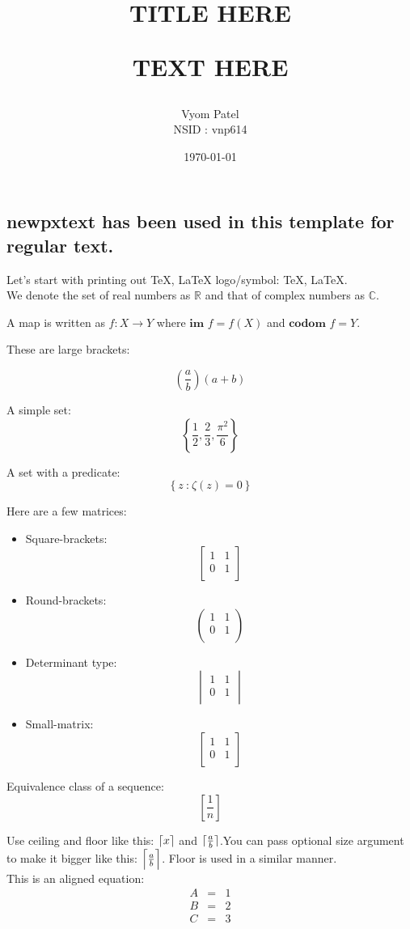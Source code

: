 \documentclass[fleqn]{article}
\title{\textbf{\huge{TITLE HERE}}
	
    \huge{TEXT HERE}
}
\author{Vyom Patel \\ NSID : vnp614}
\date{\today}
\DeclarePairedDelimiter{\ceil}{\lceil}{\rceil}
\newcommand{\latex}{\LaTeX}
\newcommand{\tex}{\TeX\xspace}
\newcommand{\R}{\mathbb{R}}
\newcommand{\C}{\mathbb{C}}
\newcommand{\fn}[3]{#1 : #2 \rightarrow #3}
\newcommand{\br}[1]{\left( #1 \right)}
\newcommand{\curly}[1]{\left\{ #1 \right\}}
\newcommand{\set}[2]{\curly{#1\ \textbf{:}\ #2}}
\newcommand{\im}{\textbf{im }}
\newcommand{\codom}{\textbf{codom }}
\newcommand{\sbr}[1]{\left[ #1 \right]}
\newcommand{\eqn}[1]{\begin{eqnarray*} #1 \end{eqnarray*}}
\newcommand{\bmat}[1]{\ensuremath{\begin{bmatrix} #1 \end{bmatrix}}}
\newcommand{\pmat}[1]{\ensuremath{\begin{pmatrix} #1 \end{pmatrix}}}
\newcommand{\vmat}[1]{\ensuremath{\begin{vmatrix} #1 \end{vmatrix}}}
\newcommand{\smat}[1]{\ensuremath{\left[\begin{smallmatrix} #1 \end{smallmatrix}\right]}}
\begin{document}
\maketitle

\subsection{newpxtext has been used in this template for regular text.}

Let's start with printing out TeX, LaTeX logo/symbol: \tex , \latex. \\
We denote the set of real numbers as $\R$ and that of complex numbers as
$\C$.

A map is written as $\fn{f}{X}{Y}$ where $\im f = f(X)$ and $\codom f = Y$.

These are large brackets:

\[
\br{\frac{a}{b}}\br{a + b}
\]

A simple set:
\[
  \curly{\frac{1}{2}, \frac{2}{3}, \frac{\pi^2}{6}}
\]

A set with a predicate:
\[
  \set{z}{\zeta\br{z} = 0}
\]

Here are a few matrices:
\begin{itemize}
  \item Square-brackets: \[
    \bmat{
      1 & 1 \\
      0 & 1 \\
    }
  \]
  \item Round-brackets: \[
    \pmat{
      1 & 1 \\
      0 & 1 \\
    }
  \]
  \item Determinant type: \[
    \vmat{
      1 & 1 \\
      0 & 1 \\
    }
  \]
  \item Small-matrix: \[
    \smat{
      1 & 1 \\
      0 & 1 \\
    }
  \]
\end{itemize}

Equivalence class of a sequence:
\[
  \sbr{\frac{1}{n}}
\]

Use ceiling and floor like this: $\ceil{x}$ and $\ceil{\frac{a}{b}}$.You can pass
optional size argument to make it bigger like this: $\ceil[\Big]{\frac{a}{b}}$.
Floor is used in a similar manner.\\

This is an aligned equation:
\eqn{
  A &=& 1\\
  B &=& 2\\
  C &=& 3
}
\end{document}
